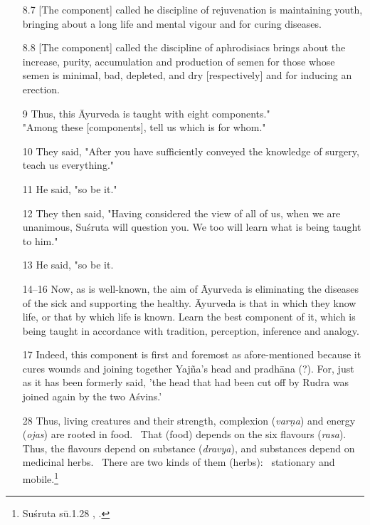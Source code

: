 \documentclass[12pt]{article}
\newcommand{\saneng}[2]{#2 (\emph{#1})}
\begin{document}
\begin{itemize}
        \item[8.7] [The component] called he discipline of rejuvenation is maintaining youth, bringing about a long life and mental vigour and for curing diseases.
        
        
        \item[8.8] [The component] called the discipline of aphrodisiacs brings about the increase, purity, accumulation and  production of semen for those whose semen is minimal, bad, depleted, and dry [respectively] and for inducing an erection.
        
        \item[9] Thus, this Āyurveda is taught with eight components."\\ 
        
        "Among these [components], tell us which is for whom."
        
        \item[10] They said, "After you have sufficiently conveyed the knowledge of surgery, teach us everything."
        
        \item[11] He said, "so be it."
        
        \item[12] They then said, "Having considered the view of all of us, when we are unanimous, Suśruta will question you. We too will learn what is being taught to him."
        
        \item[13] He said, "so be it.
        
        \item[14–16] Now, as is well-known, the aim of Āyurveda is eliminating the diseases of the sick and supporting the healthy.  Āyurveda is that in which they know life, or that by which life is known. Learn the best component of it, which is being taught in accordance with tradition, perception, inference and analogy.
        
        \item[17] Indeed, this component is first and foremost as afore-mentioned because it cures wounds and joining together Yajña's head and pradhāna (?). For, just as it has been formerly said,  'the head that had been cut off by Rudra was joined again by the two Aśvins.'
    
    
    

  
    
    
    
    
    \item [28] Thus, living creatures and their strength,
\saneng{varṇa}{complexion} and \saneng{ojas}{energy} are rooted in food.  That
(food) depends on the six \saneng{rasa}{flavours}. Thus, the flavours depend
on \saneng{dravya}{substance}, and substances depend on medicinal herbs. 
There are two kinds of them (herbs):  stationary and mobile.\footnote{Suśruta
sū.1.28 \cite[I, 21]{shar-susr}, \cite[7]{susr-trikamji2004}.}
\end{itemize}
\end{document}
